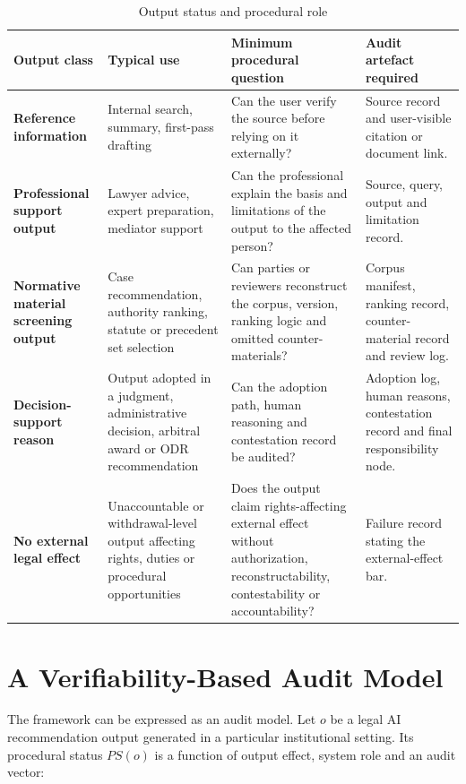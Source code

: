 \documentclass[12pt,a4paper]{article}
\begin{document}
\begin{table}[htbp]
\centering
\caption{Output status and procedural role}
\label{tab:output-status-role}
\renewcommand{\arraystretch}{1.2}
\begin{tabularx}{\textwidth}{>{\bfseries}p{2.7cm}YYY}
\toprule
Output class & Typical use & Minimum procedural question & Audit artefact required \\
\midrule
Reference information & Internal search, summary, first-pass drafting & Can the user verify the source before relying on it externally? & Source record and user-visible citation or document link. \\
Professional support output & Lawyer advice, expert preparation, mediator support & Can the professional explain the basis and limitations of the output to the affected person? & Source, query, output and limitation record. \\
Normative material screening output & Case recommendation, authority ranking, statute or precedent set selection & Can parties or reviewers reconstruct the corpus, version, ranking logic and omitted counter-materials? & Corpus manifest, ranking record, counter-material record and review log. \\
Decision-support reason & Output adopted in a judgment, administrative decision, arbitral award or ODR recommendation & Can the adoption path, human reasoning and contestation record be audited? & Adoption log, human reasons, contestation record and final responsibility node. \\
No external legal effect & Unaccountable or withdrawal-level output affecting rights, duties or procedural opportunities & Does the output claim rights-affecting external effect without authorization, reconstructability, contestability or accountability? & Failure record stating the external-effect bar. \\
\bottomrule
\end{tabularx}
\end{table}

\section{A Verifiability-Based Audit Model}

The framework can be expressed as an audit model. Let $o$ be a legal AI recommendation output generated in a particular institutional setting. Its procedural status $PS(o)$ is a function of output effect, system role and an audit vector:
\end{document}
